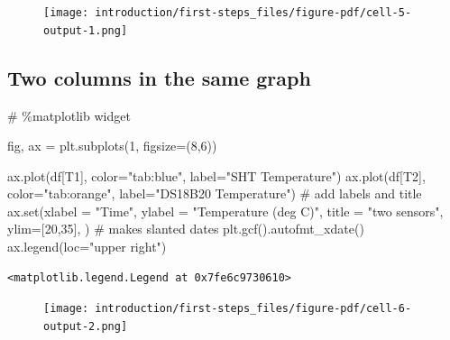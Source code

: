 \documentclass[
  letterpaper,
  DIV=11,
  numbers=noendperiod,
  oneside]{scrreprt}
\newenvironment{Shaded}{\begin{snugshade}}{\end{snugshade}}
\newcommand{\BuiltInTok}[1]{\textcolor[rgb]{0.00,0.23,0.31}{#1}}
\newcommand{\CommentTok}[1]{\textcolor[rgb]{0.37,0.37,0.37}{#1}}
\newcommand{\DecValTok}[1]{\textcolor[rgb]{0.68,0.00,0.00}{#1}}
\newcommand{\NormalTok}[1]{\textcolor[rgb]{0.00,0.23,0.31}{#1}}
\newcommand{\OperatorTok}[1]{\textcolor[rgb]{0.37,0.37,0.37}{#1}}
\newcommand{\StringTok}[1]{\textcolor[rgb]{0.13,0.47,0.30}{#1}}
\begin{document}
\begin{figure}[H]

{\centering \texttt{[image: introduction/first-steps\_files/figure-pdf/cell-5-output-1.png]}

}

\end{figure}

\hypertarget{two-columns-in-the-same-graph}{%
\subsection{Two columns in the same
graph}\label{two-columns-in-the-same-graph}}

\begin{Shaded}
\begin{Highlighting}[]
\CommentTok{\# \%matplotlib widget}

\NormalTok{fig, ax }\OperatorTok{=}\NormalTok{ plt.subplots(}\DecValTok{1}\NormalTok{, figsize}\OperatorTok{=}\NormalTok{(}\DecValTok{8}\NormalTok{,}\DecValTok{6}\NormalTok{))}

\NormalTok{ax.plot(df[}\StringTok{\textquotesingle{}T1\textquotesingle{}}\NormalTok{], color}\OperatorTok{=}\StringTok{"tab:blue"}\NormalTok{, label}\OperatorTok{=}\StringTok{"SHT Temperature"}\NormalTok{)}
\NormalTok{ax.plot(df[}\StringTok{\textquotesingle{}T2\textquotesingle{}}\NormalTok{], color}\OperatorTok{=}\StringTok{"tab:orange"}\NormalTok{, label}\OperatorTok{=}\StringTok{"DS18B20 Temperature"}\NormalTok{)}
\CommentTok{\# add labels and title}
\NormalTok{ax.}\BuiltInTok{set}\NormalTok{(xlabel }\OperatorTok{=} \StringTok{"Time"}\NormalTok{,}
\NormalTok{       ylabel }\OperatorTok{=} \StringTok{"Temperature (deg C)"}\NormalTok{,}
\NormalTok{       title }\OperatorTok{=} \StringTok{"two sensors"}\NormalTok{,}
\NormalTok{       ylim}\OperatorTok{=}\NormalTok{[}\DecValTok{20}\NormalTok{,}\DecValTok{35}\NormalTok{],}
\NormalTok{       )}
\CommentTok{\# makes slanted dates}
\NormalTok{plt.gcf().autofmt\_xdate()}
\NormalTok{ax.legend(loc}\OperatorTok{=}\StringTok{"upper right"}\NormalTok{)}
\end{Highlighting}
\end{Shaded}

\begin{verbatim}
<matplotlib.legend.Legend at 0x7fe6c9730610>
\end{verbatim}

\begin{figure}[H]

{\centering \texttt{[image: introduction/first-steps\_files/figure-pdf/cell-6-output-2.png]}

}

\end{figure}
\end{document}
